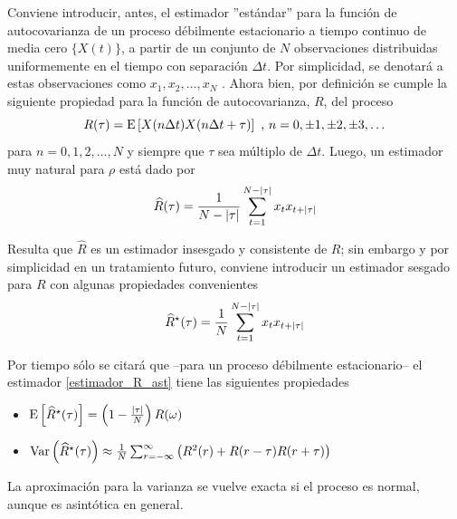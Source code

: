 Conviene introducir, antes, el estimador ''est\'andar''
para la funci\'on de autocovarianza de un proceso
d\'ebilmente estacionario a tiempo continuo de media cero $\{ X(t) \}$, 
a partir de un conjunto de $N$ 
observaciones distribuidas uniformemente en el tiempo con separaci\'on $\Delta t$.
Por simplicidad, se denotar\'a a estas observaciones como $x_1, x_2 , \dots, x_N$ .
Ahora bien, 
por definici\'on se cumple la siguiente propiedad para la funci\'on de autocovarianza, $R$,
del proceso
\begin{equation*}
R(\tau)
= \mathrm{E}\left[ X(n\Delta t)X(n\Delta t + \tau) \right] \text{  ,  } n = 0,\pm 1,\pm 2, \pm 3,\dots
\end{equation*}
para $n = 0, 1, 2, \dots, N$ y siempre que $\tau$ sea m\'ultiplo de
$\Delta t$. Luego, un estimador muy natural para $\rho$ est\'a dado por
\begin{equation}
\widehat{R}(\tau) = \frac{1}{N-\left| \tau \right|} 
\sum_{t = 1}^{N-\left| \tau \right|} x_t x_{t+\left| \tau \right|}
\label{estimador_R}
\end{equation}

Resulta que $\widehat{R}$ es un estimador insesgado y consistente de $R$;
sin embargo y por simplicidad en un tratamiento futuro, 
conviene introducir un estimador sesgado para $R$ con algunas propiedades convenientes
\begin{equation}
\widehat{ R }^{\star}(\tau) = \frac{1}{N} 
\sum_{t = 1}^{N-\left| \tau \right|} x_t x_{t+\left| \tau \right|}
\label{estimador_R_ast}
\end{equation}

Por tiempo s\'olo se citar\'a que --para un proceso d\'ebilmente estacionario-- el
estimador \ref{estimador_R_ast} tiene las siguientes propiedades
\begin{itemize}
\item $\mathrm{E}\left[ \widehat{ R }^{\star}(\tau) \right] = \left(1 - \frac{\left| \tau \right|}{N} \right) R(\omega)$
\item $\mathrm{Var}\left( \widehat{ R }^{\star}(\tau) \right) \approx \frac{1}{N} 
\sum_{r=-\infty}^{\infty} \left( R^{2}(r) + R(r-\tau)R(r+\tau) \right)$
\end{itemize}
La aproximaci\'on 
para la varianza se vuelve
exacta si el proceso es normal, aunque es asint\'otica en general.


